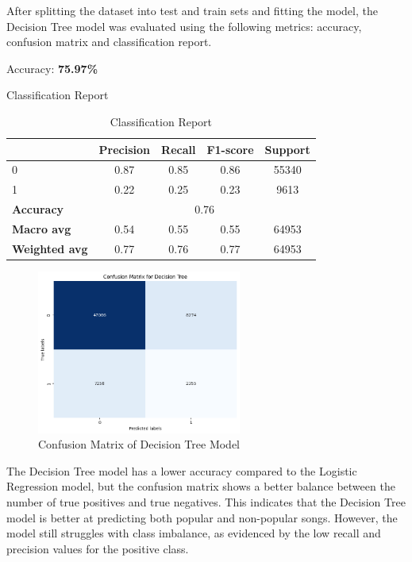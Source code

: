 After splitting the dataset into test and train sets and fitting the model, the Decision Tree model was evaluated using the following metrics: accuracy, confusion matrix and classification report.


Accuracy: \textbf{75.97\%}

Classification Report
\begin{table}[h]
    \centering
    \begin{tabular}{lcccc}
        \toprule
        & \textbf{Precision} & \textbf{Recall} & \textbf{F1-score} & \textbf{Support} \\
        \midrule
        0 & 0.87 & 0.85 & 0.86 & 55340 \\
        1 & 0.22 & 0.25 & 0.23 & 9613 \\
        \midrule
        \textbf{Accuracy} & \multicolumn{4}{c}{0.76} \\
        \textbf{Macro avg} & 0.54 & 0.55 & 0.55 & 64953 \\
        \textbf{Weighted avg} & 0.77 & 0.76 & 0.77 & 64953 \\
        \bottomrule
    \end{tabular}
    \caption{Classification Report}
    \label{tab:classification_report}
\end{table}
 
\begin{figure}[h] 
    \centering 
    \includegraphics[width=0.6\textwidth]{media/decision_tree_conf_matr.png}
    \caption{Confusion Matrix of Decision Tree Model}

\end{figure}

The Decision Tree model has a lower accuracy compared to the Logistic Regression model, but the confusion matrix shows a better balance between the number of true positives and true negatives. This indicates that the Decision Tree model is better at predicting both popular and non-popular songs. However, the model still struggles with class imbalance, as evidenced by the low recall and precision values for the positive class. %

